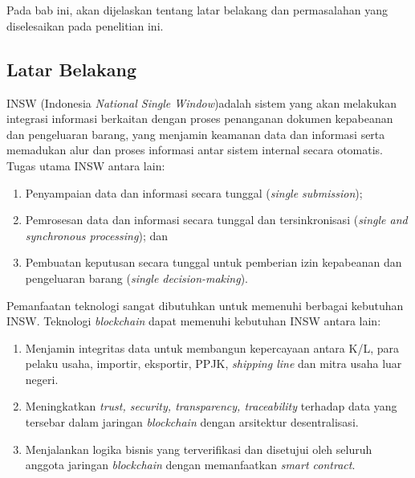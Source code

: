 \chapter{\babSatu}
\label{bab:1}
Pada bab ini, akan dijelaskan tentang latar belakang dan permasalahan yang diselesaikan pada penelitian ini.


\section{Latar Belakang}
\label{sec:latarBelakang}


INSW (Indonesia \textit{National Single Window})adalah sistem yang akan melakukan integrasi informasi berkaitan dengan proses penanganan dokumen kepabeanan dan pengeluaran barang, yang menjamin keamanan data dan informasi serta memadukan alur dan proses informasi antar sistem internal secara otomatis. Tugas utama INSW antara lain:
\begin{enumerate}
  \item Penyampaian data dan informasi secara tunggal (\textit{single submission});
  \item Pemrosesan data dan informasi secara tunggal dan tersinkronisasi (\textit{single and synchronous processing}); dan 
  \item Pembuatan keputusan secara tunggal untuk pemberian izin kepabeanan dan pengeluaran barang (\textit{single decision-making}).
\end{enumerate}

Pemanfaatan teknologi sangat dibutuhkan untuk memenuhi berbagai kebutuhan INSW. Teknologi \textit{blockchain} dapat memenuhi kebutuhan INSW antara lain:
\begin{enumerate}
  \item Menjamin integritas data untuk membangun kepercayaan antara K/L, para pelaku usaha, importir, eksportir, PPJK, \textit{shipping line} dan mitra usaha luar negeri.
  \item Meningkatkan \textit{trust, security, transparency, traceability} terhadap data yang tersebar dalam jaringan \textit{blockchain} dengan arsitektur desentralisasi.
  \item Menjalankan logika bisnis yang terverifikasi dan disetujui oleh seluruh anggota jaringan \textit{blockchain} dengan memanfaatkan \textit{smart contract}.
\end{enumerate}


